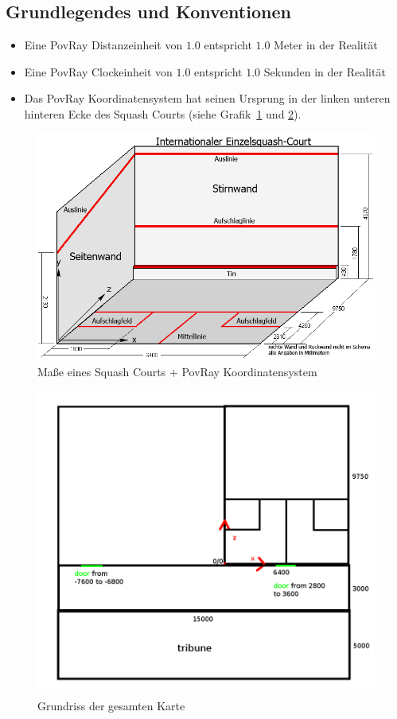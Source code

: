\subsection{Grundlegendes und Konventionen}
\begin{itemize}
	\item Eine PovRay Distanzeinheit von $1.0$ entspricht $1.0$ Meter in der Realität
	\item Eine PovRay Clockeinheit von $1.0$ entspricht $1.0$ Sekunden in der Realität
	\item Das PovRay Koordinatensystem hat seinen Ursprung in der linken unteren hinteren Ecke des Squash Courts (siehe Grafik~\ref{fig:squashcourt} und \ref{fig:halloutline}).
\end{itemize}
%
\begin{figure}%
	\centering
	\includegraphics[width=.9\linewidth]{images/Squash_Court.png}
	\caption{Maße eines Squash Courts + PovRay Koordinatensystem}\label{fig:squashcourt}
\end{figure}
\begin{figure}%
	\centering
	\includegraphics[width=.7\linewidth]{images/hall_outline.png}
	\caption{Grundriss der gesamten Karte}\label{fig:halloutline}
\end{figure}
